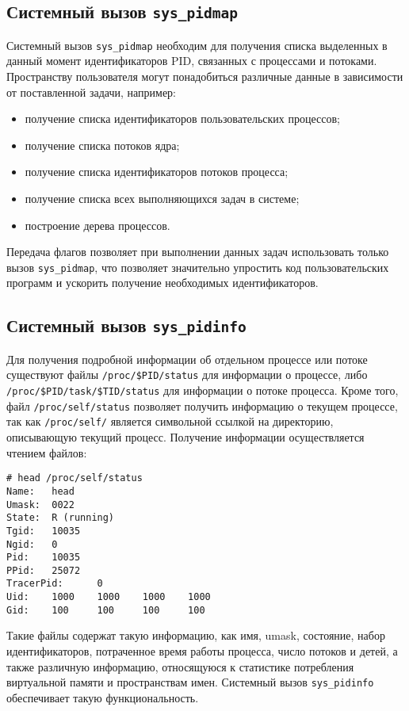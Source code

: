 \subsection{Системный вызов \texttt{sys\_pidmap}}
\label{sub:sys:sys_pidmap}

Системный вызов \texttt{sys\_pidmap} необходим для получения списка выделенных в
данный момент идентификаторов PID, связанных с процессами и потоками.
Пространству пользователя могут понадобиться различные данные в зависимости от
поставленной задачи, например:
\begin{itemize}
\item получение списка идентификаторов пользовательских процессов;
\item получение списка потоков ядра;
\item получение списка идентификаторов потоков процесса;
\item получение списка всех выполняющихся задач в системе;
\item построение дерева процессов.
\end{itemize}

Передача флагов позволяет при выполнении данных задач использовать только вызов
\texttt{sys\_pidmap}, что позволяет значительно упростить код пользовательских
программ и ускорить получение необходимых идентификаторов.

\subsection{Системный вызов \texttt{sys\_pidinfo}}
\label{sub:sys:sys_pidinfo}

Для получения подробной информации об отдельном процессе или потоке существуют
файлы \texttt{/proc/\$PID/status} для информации о процессе, либо
\texttt{/proc/\$PID/task/\$TID/status} для информации о потоке процесса. Кроме
того, файл \texttt{/proc/self/status} позволяет получить информацию о текущем
процессе, так как \texttt{/proc/self/} является символьной ссылкой на
директорию, описывающую текущий процесс. Получение информации осуществляется
чтением файлов:

\medskip
\begin{lstlisting}[style=cstyle]
# head /proc/self/status
Name:   head
Umask:  0022
State:  R (running)
Tgid:   10035
Ngid:   0
Pid:    10035
PPid:   25072
TracerPid:      0
Uid:    1000    1000    1000    1000
Gid:    100     100     100     100
\end{lstlisting}
\medskip

Такие файлы содержат такую информацию, как имя, umask, состояние, набор
идентификаторов, потраченное время работы процесса, число потоков и детей, а
также различную информацию, относящуюся к статистике потребления виртуальной
памяти и пространствам имен. Системный вызов \texttt{sys\_pidinfo} обеспечивает
такую функциональность.

